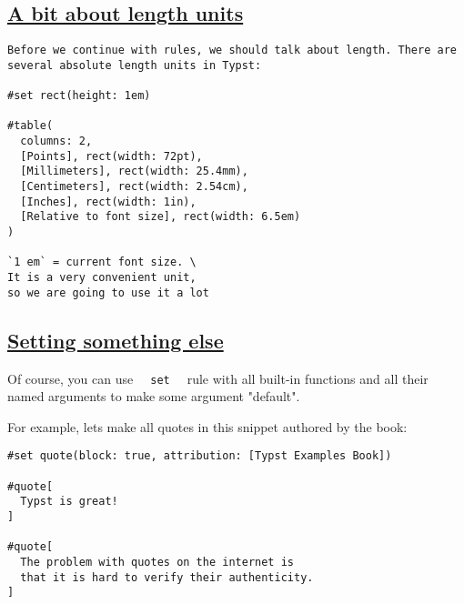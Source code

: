 \pandocbounded{}

\subsection{\texorpdfstring{\hyperref[a-bit-about-length-units]{A bit
about length
units}}{A bit about length units}}\label{a-bit-about-length-units}

\begin{verbatim}
Before we continue with rules, we should talk about length. There are several absolute length units in Typst:

#set rect(height: 1em)

#table(
  columns: 2,
  [Points], rect(width: 72pt),
  [Millimeters], rect(width: 25.4mm),
  [Centimeters], rect(width: 2.54cm),
  [Inches], rect(width: 1in),
  [Relative to font size], rect(width: 6.5em)
)

`1 em` = current font size. \
It is a very convenient unit,
so we are going to use it a lot
\end{verbatim}

\pandocbounded{}

\subsection{\texorpdfstring{\hyperref[setting-something-else]{Setting
something else}}{Setting something else}}\label{setting-something-else}

Of course, you can use \texttt{\ }{\texttt{\ set\ }}\texttt{\ } rule
with all built-in functions and all their named arguments to make some
argument "default".

For example, let\textquotesingle s make all quotes in this snippet
authored by the book:

\begin{verbatim}
#set quote(block: true, attribution: [Typst Examples Book])

#quote[
  Typst is great!
]

#quote[
  The problem with quotes on the internet is
  that it is hard to verify their authenticity.
]
\end{verbatim}

\pandocbounded{}

